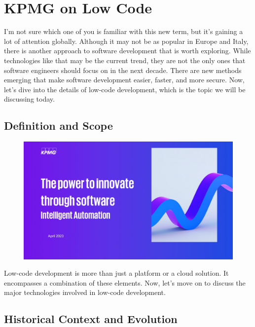\section{KPMG on Low Code}\label{introduction-to-low-code-development}

I'm not sure which one of you is familiar with this new term, but it's
gaining a lot of attention globally. Although it may not be as popular
in Europe and Italy, there is another approach to software development
that is worth exploring. While technologies like that may be the current
trend, they are not the only ones that software engineers should focus
on in the next decade. There are new methods emerging that make software
development easier, faster, and more secure. Now, let's dive into the
details of low-code development, which is the topic we will be
discussing today.

\subsection{Definition and Scope}\label{definition-and-scope}

\begin{figure}[!h]
  \centering
  \includegraphics[page=7, trim = 2cm 2cm 2cm 0cm, clip, width=\imagewidth]{images/02 - KPMG_intelligent_automation_2.pdf}
\end{figure}

Low-code development is more than just a platform or a cloud solution.
It encompasses a combination of these elements. Now, let's move on
to discuss the major technologies involved in low-code development.

\subsection{Historical Context and
  Evolution}\label{historical-context-and-evolution}

